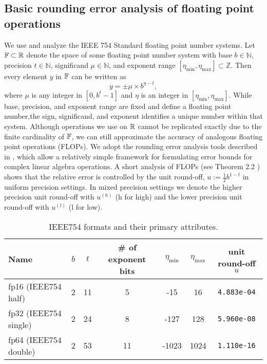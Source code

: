 \subsection{Basic rounding error analysis of floating point operations}\label{sec:backgroundRE}
We use and analyze the IEEE 754 Standard floating point number systems.
Let $\mathbb{F} \subset \mathbb{R}$ denote the space of some floating point number system with base $b\in\mathbb{N}$, precision $t\in\mathbb{N}$, significand $\mu\in\mathbb{N}$, and exponent range $[\eta_{\text{min}}, \eta_{\text{max}}]\subset \mathbb{Z}$.
Then every element $y$ in $\mathbb{F}$ can be written as 
\begin{equation}
y = \pm \mu\times b^{\eta-t},
\label{eqn:FPbasic}
\end{equation} 
where $\mu$ is any integer in $[0,b^{t}-1]$ and $\eta$ is an integer in  $[\eta_{\text{min}}, \eta_{\text{max}}]$.
While base, precision, and exponent range are fixed and define a floating point number,the sign, significand, and exponent identifies a unique number within that system.
Although operations we use on $\mathbb{R}$ cannot be replicated exactly due to the finite cardinality of $\mathbb{F}$, we can still approximate the accuracy of analogous floating point operations (FLOPs).
We adopt the rounding error analysis tools described in \cite{Higham2002}, which allow a relatively simple framework for formulating error bounds for complex linear algebra operations. 
A short analysis of FLOPs (see Theorem 2.2 \cite{Higham2002}) shows that the relative error is 
controlled by the unit round-off, $u:=\frac{1}{2}b^{1-t}$ in uniform precision settings. 
In mixed precision settings we denote the higher precision unit round-off with $u^{(h)}$ (h for high) and the lower precision unit round-off with $u^{(l)}$ (l for low).\par 
\vspace{.2cm}
\begin{table}[H]
	\begin{tabular}{||l|c|c|c|c|c|c||} 
		\hline 
		Name & $b$ & $t$ & \# of exponent bits & $\eta_{\text{min}}$ & $\eta_{\text{max}}$ & unit round-off $u$ \\ \hline 
		fp16 (IEEE754 half)& 2 & 11 & 5 & -15 & 16  & {\tt 4.883e-04} \\ \hline 
		fp32 (IEEE754 single)& 2 & 24 & 8 & -127 & 128  & {\tt 5.960e-08} \\ \hline 
		fp64 (IEEE754 double)& 2 & 53 & 11 & -1023 & 1024 & {\tt 1.110e-16} \\ \hline 
	\end{tabular}
	\caption{IEEE754 formats and their primary attributes.} %
	\label{table:ieee}
\end{table}
\vspace{.2cm}

